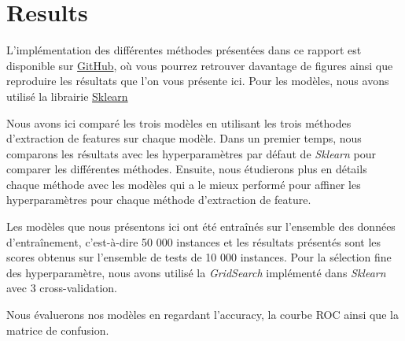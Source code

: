 \section{Results}
L'implémentation des différentes méthodes présentées dans ce rapport est disponible sur \href{https://github.com/ElouanV/mlrf-sciag-2024}{GitHub}, où vous pourrez retrouver davantage de figures ainsi que reproduire les résultats que l'on vous présente ici. Pour les modèles, nous avons utilisé la librairie \href{https://scikit-learn.org/stable/}{Sklearn}

Nous avons ici comparé les trois modèles en utilisant les trois méthodes d'extraction de features sur chaque modèle. Dans un premier temps, nous comparons les résultats avec les hyperparamètres par défaut de \textit{Sklearn} pour comparer les différentes méthodes.
Ensuite, nous étudierons plus en détails chaque méthode avec les modèles qui a le mieux performé pour affiner les hyperparamètres pour chaque méthode d'extraction de feature.

Les modèles que nous présentons ici ont été entraînés sur l'ensemble des données d'entraînement, c'est-à-dire 50 000 instances et les résultats présentés sont les scores obtenus sur l'ensemble de tests de 10 000 instances. Pour la sélection fine des hyperparamètre, nous avons utilisé la \textit{GridSearch} implémenté dans \textit{Sklearn} avec 3 cross-validation.

Nous évaluerons nos modèles en regardant l'accuracy, la courbe ROC ainsi que la matrice de confusion.

